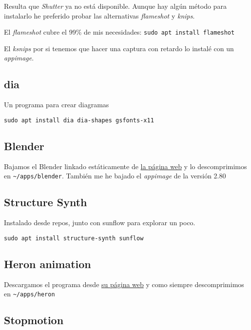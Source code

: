\documentclass[
  12pt,
  spanish,
]{article}
\begin{document}
Resulta que \emph{Shutter} ya no está disponible. Aunque hay algún
método para instalarlo he preferido probar las alternativas
\emph{flameshot} y \emph{knips}.

El \emph{flameshot} cubre el 99\% de mis necesidades:
\texttt{sudo\ apt\ install\ flameshot}

El \emph{ksnips} por si tenemos que hacer una captura con retardo lo
instalé con un \emph{appimage}.

\hypertarget{dia}{%
\subsection{dia}\label{dia}}

Un programa para crear diagramas

\begin{verbatim}
sudo apt install dia dia-shapes gsfonts-x11
\end{verbatim}

\hypertarget{blender}{%
\subsection{Blender}\label{blender}}

Bajamos el Blender linkado estáticamente de
\href{https://www.blender.org}{la página web} y lo descomprimimos en
\texttt{\textasciitilde{}/apps/blender}. También me he bajado el
\emph{appimage} de la versión 2.80

\hypertarget{structure-synth}{%
\subsection{Structure Synth}\label{structure-synth}}

Instalado desde repos, junto con sunflow para explorar un poco.

\begin{verbatim}
sudo apt install structure-synth sunflow
\end{verbatim}

\hypertarget{heron-animation}{%
\subsection{Heron animation}\label{heron-animation}}

Descargamos el programa desde
\href{https://heronanimation.brunolefevre.net/}{su página web} y como
siempre descomprimimos en \texttt{\textasciitilde{}/apps/heron}

\hypertarget{stopmotion}{%
\subsection{Stopmotion}\label{stopmotion}}
\end{document}

